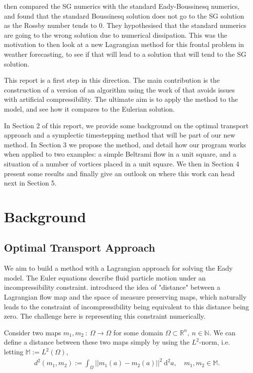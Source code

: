 \documentclass[11pt, oneside]{article}   	%
\newcommand{\R}{\mathbb{R}}
\newcommand{\M}{\mathbb{M}}
\newcommand{\N}{\mathbb{N}}
\begin{document}
\cite{visram2014framework} then compared the SG numerics with the standard Eady-Boussinesq numerics, and found that the standard Boussinesq solution does not go to the SG solution as the Rossby number tends to \(0\). They hypothesised that the standard numerics are going to the wrong solution due to numerical dissipation. This was the motivation to then look at a new Lagrangian method for this frontal problem in weather forecasting, to see if that will lead to a solution that will tend to the SG solution. 

This report is a first step in this direction. The main contribution is the construction of a version of an algorithm using the work of \cite{gallouet2016lagrangian} that avoids issues with artificial compressibility. The ultimate aim is to apply the method to the model, and see how it compares to the Eulerian solution.

In Section 2 of this report, we provide some background on the optimal transport approach and a symplectic timestepping method that will be part of our new method. In Section 3 we propose the method, and detail how our program works when applied to two examples: a simple Beltrami flow in a unit square, and a situation of a number of vortices placed in a unit square. We then in Section 4 present some results and finally give an outlook on where this work can head next in Section 5.


\section{Background}

\subsection{Optimal Transport Approach}

We aim to build a method with a Lagrangian approach for solving the Eady model. The Euler equations describe fluid particle motion under an incompressibility constraint. \cite{brenier1989least} introduced the idea of "distance" between a Lagrangian flow map and the space of measure preserving maps, which naturally leads to the constraint of incompressibility being equivalent to this distance being zero. The challenge here is representing this constraint numerically.

Consider two maps \(m_1, m_2 \: : \: \Omega \to \Omega\) for some domain \(\Omega \subset \R^n, \: n \in \N\). We can define a distance between these two maps simply by using the \(L^2\)-norm, i.e. letting \(\M := L^2(\Omega)\), 
\begin{align}
d^2(m_1, m_2) := \int_\Omega || m_1(a) - m_2(a) ||^2 \: \mathrm{d}^2 a, \quad m_1, m_2 \in \M.
\end{align}
\end{document}
